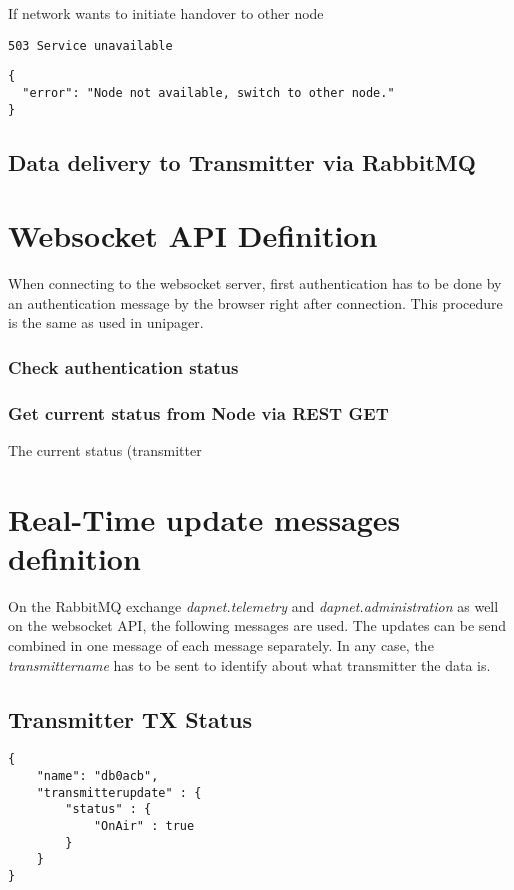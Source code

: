 \documentclass[a4paper]{article}
\begin{document}
If network wants to initiate handover to other node

\texttt{503 Service unavailable}
\begin{lstlisting}
{
  "error": "Node not available, switch to other node."
}
\end{lstlisting}

\subsection{Data delivery to Transmitter via RabbitMQ}



\section{Websocket API Definition}
\label{sec:websocket_api_definition}
When connecting to the websocket server, first authentication has to be done by an authentication message by the browser right after connection. This procedure is the same as used in unipager.

\subsubsection{Check authentication status}

\subsubsection{Get current status from Node via REST GET}
The current status (transmitter

\section{Real-Time update messages definition}
On the RabbitMQ exchange \textit{dapnet.telemetry} and \textit{dapnet.administration} as well on the websocket API, the following messages are used. The updates can be send combined in one message of each message separately. In any case, the \textit{transmittername} has to be sent to identify about what transmitter the data is.

\subsection{Transmitter TX Status}
\begin{lstlisting}
{
    "name": "db0acb",
    "transmitterupdate" : {
        "status" : {
            "OnAir" : true
        }
    }
}
\end{lstlisting}
\end{document}
